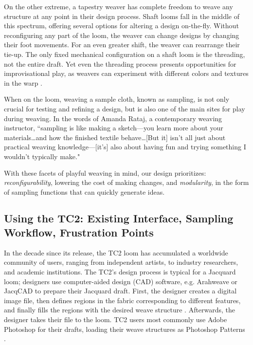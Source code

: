 On the other extreme, a tapestry weaver has complete freedom to weave any structure at any point in their design process. Shaft looms fall in the middle of this spectrum, offering several options for altering a design on-the-fly. Without reconfiguring any part of the loom, the weaver can change designs by changing their foot movements. For an even greater shift, the weaver can rearrange their tie-up. The only fixed mechanical configuration on a shaft loom is the threading, not the entire draft. Yet even the threading process presents opportunities for improvisational play, as weavers can experiment with different colors and textures in the warp \cite{essen_easy_2016}.

When on the loom, weaving a sample cloth, known as sampling, is not only crucial for testing and refining a design, but is also one of the main sites for play during weaving. In the words of Amanda Rataj, a contemporary weaving instructor, ``sampling is like making a sketch---you learn more about your materials\ldots{}and how the finished textile behave\ldots{}[But it] isn’t all just about practical weaving knowledge---[it’s] also about having fun and trying something I wouldn’t typically make." \cite{rataj_tips_2020}

With these facets of playful weaving in mind, our design prioritizes: \textit{reconfigurability}, lowering the cost of making changes, and \textit{modularity}, in the form of sampling functions that can quickly generate ideas.

\subsection{Using the TC2: Existing Interface, Sampling Workflow, Frustration Points}

In the decade since its release, the TC2 loom has accumulated a worldwide community of users, ranging from independent artists, to industry researchers, and academic institutions. The TC2's design process is typical for a Jacquard loom; designers use computer-aided design (CAD) software, e.g. Arahweave \cite{arahweave_2023} or JacqCAD \cite{jacqcad_2019} to prepare their Jacquard draft. First, the designer creates a digital image file, then defines regions in the fabric corresponding to different features, and finally fills the regions with the desired weave structure \cite{holyoke_digital_2013}. Afterwards, the designer takes their file to the loom. TC2 users most commonly use Adobe Photoshop for their drafts, loading their weave structures as Photoshop Patterns \cite{schlein_woven_2007}.

